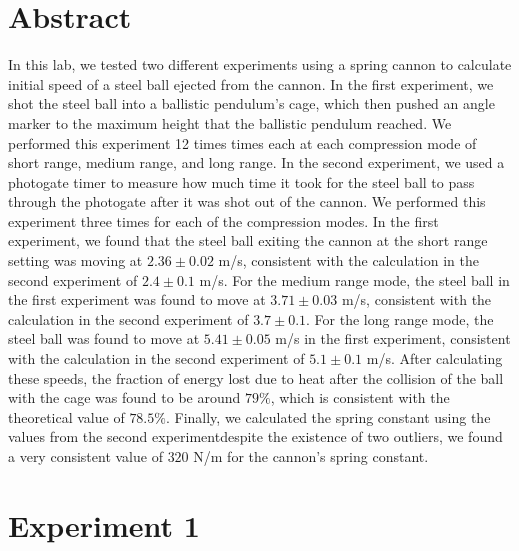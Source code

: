 \documentclass[8pt]{extarticle}
\title{}
\author{Avinash Iyer}
\date{}
\begin{document}
{
\section*{Abstract}
In this lab, we tested two different experiments using a spring cannon to calculate initial speed of a steel ball ejected from the cannon. In the first experiment, we shot the steel ball into a ballistic pendulum's cage, which then pushed an angle marker to the maximum height that the ballistic pendulum reached. We performed this experiment 12 times times each at each compression mode of short range, medium range, and long range. In the second experiment, we used a photogate timer to measure how much time it took for the steel ball to pass through the photogate after it was shot out of the cannon. We performed this experiment three times for each of the compression modes. In the first experiment, we found that the steel ball exiting the cannon at the short range setting was moving at $2.36\pm 0.02$ m/s, consistent with the calculation in the second experiment of $2.4\pm 0.1$ m/s. For the medium range mode, the steel ball in the first experiment was found to move at $3.71\pm 0.03$ m/s, consistent with the calculation in the second experiment of $3.7\pm 0.1$. For the long range mode, the steel ball was found to move at $5.41\pm 0.05$ m/s in the first experiment, consistent with the calculation in the second experiment of $5.1\pm 0.1$ m/s. After calculating these speeds, the fraction of energy lost due to heat after the collision of the ball with the cage was found to be around $79\%$, which is consistent with the theoretical value of $78.5\%$. Finally, we calculated the spring constant using the values from the second experiment\textendash despite the existence of two outliers, we found a very consistent value of $320$ N/m for the cannon's spring constant.
\section*{Experiment 1}
}
\end{document}
